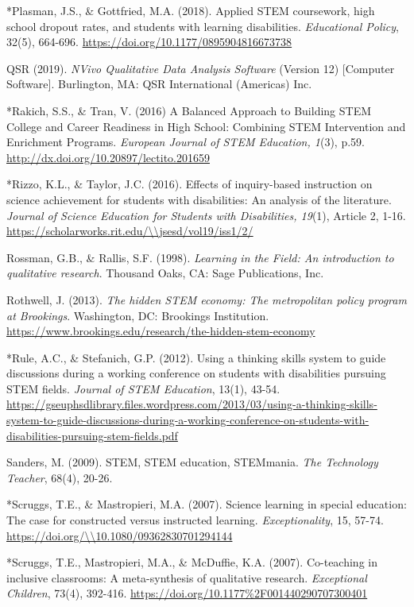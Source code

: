 \documentclass[11pt]{sig-alternate}
\begin{document}
\begin{large}
*Plasman, J.S., \& Gottfried, M.A. (2018). Applied STEM coursework, high school dropout rates, and students with learning disabilities. \textit{Educational Policy}, 32(5), 664-696. \url{https://doi.org/10.1177/0895904816673738}

QSR (2019). \textit{NVivo Qualitative Data Analysis Software }(Version 12) [Computer Software]. Burlington, MA: QSR International (Americas) Inc.

*Rakich, S.S., \& Tran, V. (2016) A Balanced Approach to Building STEM College and Career Readiness in High School: Combining STEM Intervention and Enrichment Programs. \textit{European Journal of STEM Education, 1}(3), p.59. \url{http://dx.doi.org/10.20897/lectito.201659}

*Rizzo, K.L., \& Taylor, J.C. (2016). Effects of inquiry-based instruction on science achievement for students with disabilities: An analysis of the literature.\textit{ Journal of Science Education for Students with Disabilities, 19}(1), Article 2, 1-16. \url{https://scholarworks.rit.edu/\\jsesd/vol19/iss1/2/}

Rossman, G.B., \& Rallis, S.F. (1998). \textit{Learning in the Field: An introduction to qualitative 
research}. Thousand Oaks, CA: Sage Publications, Inc.

Rothwell, J. (2013). \textit{The hidden STEM economy: The metropolitan policy program at Brookings}. Washington, DC: Brookings Institution. \url{https://www.brookings.edu/research/the-hidden-stem-economy}

*Rule, A.C., \& Stefanich, G.P. (2012). Using a thinking skills system to guide discussions during a working conference on students with disabilities pursuing STEM fields. \textit{Journal of STEM Education}, 13(1), 43-54. \url{https://gseuphsdlibrary.files.wordpress.com/2013/03/using-a-thinking-skills-system-to-guide-discussions-during-a-working-conference-on-students-with-disabilities-pursuing-stem-fields.pdf}

Sanders, M. (2009). STEM, STEM education, STEMmania. \textit{The Technology Teacher}, 68(4),
20-26.

*Scruggs, T.E., \& Mastropieri, M.A. (2007). Science learning in special education: The case for 
constructed versus instructed learning. \textit{Exceptionality}, 15, 57-74. \url{https://doi.org/\\10.1080/09362830701294144}

*Scruggs, T.E., Mastropieri, M.A., \& McDuffie, K.A. (2007). Co-teaching in inclusive classrooms: A meta-synthesis of qualitative research. \textit{Exceptional Children}, 73(4),
392-416. \url{https://doi.org/10.1177%2F001440290707300401}


\end{large}
\end{document}
